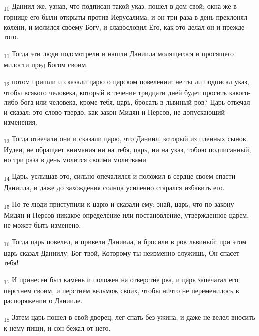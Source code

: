 \begin{tcolorbox}
\textsubscript{10} Даниил же, узнав, что подписан такой указ, пошел в дом свой; окна же в горнице его были открыты против Иерусалима, и он три раза в день преклонял колени, и молился своему Богу, и славословил Его, как это делал он и прежде того.
\end{tcolorbox}
\begin{tcolorbox}
\textsubscript{11} Тогда эти люди подсмотрели и нашли Даниила молящегося и просящего милости пред Богом своим,
\end{tcolorbox}
\begin{tcolorbox}
\textsubscript{12} потом пришли и сказали царю о царском повелении: не ты ли подписал указ, чтобы всякого человека, который в течение тридцати дней будет просить какого-либо бога или человека, кроме тебя, царь, бросать в львиный ров? Царь отвечал и сказал: это слово твердо, как закон Мидян и Персов, не допускающий изменения.
\end{tcolorbox}
\begin{tcolorbox}
\textsubscript{13} Тогда отвечали они и сказали царю, что Даниил, который из пленных сынов Иудеи, не обращает внимания ни на тебя, царь, ни на указ, тобою подписанный, но три раза в день молится своими молитвами.
\end{tcolorbox}
\begin{tcolorbox}
\textsubscript{14} Царь, услышав это, сильно опечалился и положил в сердце своем спасти Даниила, и даже до захождения солнца усиленно старался избавить его.
\end{tcolorbox}
\begin{tcolorbox}
\textsubscript{15} Но те люди приступили к царю и сказали ему: знай, царь, что по закону Мидян и Персов никакое определение или постановление, утвержденное царем, не может быть изменено.
\end{tcolorbox}
\begin{tcolorbox}
\textsubscript{16} Тогда царь повелел, и привели Даниила, и бросили в ров львиный; при этом царь сказал Даниилу: Бог твой, Которому ты неизменно служишь, Он спасет тебя!
\end{tcolorbox}
\begin{tcolorbox}
\textsubscript{17} И принесен был камень и положен на отверстие рва, и царь запечатал его перстнем своим, и перстнем вельмож своих, чтобы ничто не переменилось в распоряжении о Данииле.
\end{tcolorbox}
\begin{tcolorbox}
\textsubscript{18} Затем царь пошел в свой дворец, лег спать без ужина, и даже не велел вносить к нему пищи, и сон бежал от него.
\end{tcolorbox}
